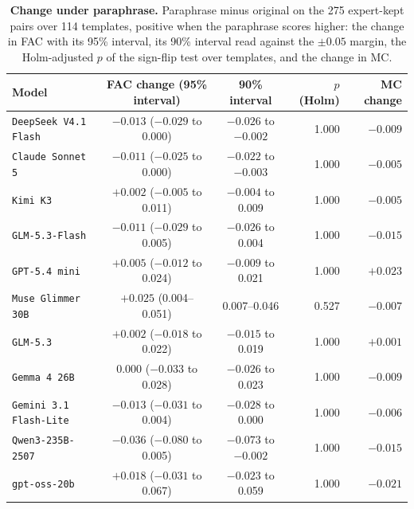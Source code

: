 \begin{table}[t]
\centering
\footnotesize
\renewcommand{\arraystretch}{1.1}
\begin{tabular}{l c c r r}
\toprule
\rowcolor{gray!10}
\textbf{Model} & \textbf{FAC change (95\% interval)} & \textbf{90\% interval} & \textbf{$p$ (Holm)} & \textbf{MC change} \\
\midrule
\texttt{DeepSeek V4.1 Flash} & $-0.013$ ($-0.029$ to 0.000) & $-0.026$ to $-0.002$ & 1.000 & $-0.009$ \\
\texttt{Claude Sonnet 5} & $-0.011$ ($-0.025$ to 0.000) & $-0.022$ to $-0.003$ & 1.000 & $-0.005$ \\
\texttt{Kimi K3} & $+0.002$ ($-0.005$ to 0.011) & $-0.004$ to 0.009 & 1.000 & $-0.005$ \\
\texttt{GLM-5.3-Flash} & $-0.011$ ($-0.029$ to 0.005) & $-0.026$ to 0.004 & 1.000 & $-0.015$ \\
\texttt{GPT-5.4 mini} & $+0.005$ ($-0.012$ to 0.024) & $-0.009$ to 0.021 & 1.000 & $+0.023$ \\
\texttt{Muse Glimmer 30B} & $+0.025$ (0.004--0.051) & 0.007--0.046 & 0.527 & $-0.007$ \\
\texttt{GLM-5.3} & $+0.002$ ($-0.018$ to 0.022) & $-0.015$ to 0.019 & 1.000 & $+0.001$ \\
\texttt{Gemma 4 26B} & $0.000$ ($-0.033$ to 0.028) & $-0.026$ to 0.023 & 1.000 & $-0.009$ \\
\texttt{Gemini 3.1 Flash-Lite} & $-0.013$ ($-0.031$ to 0.004) & $-0.028$ to 0.000 & 1.000 & $-0.006$ \\
\texttt{Qwen3-235B-2507} & $-0.036$ ($-0.080$ to 0.005) & $-0.073$ to $-0.002$ & 1.000 & $-0.015$ \\
\texttt{gpt-oss-20b} & $+0.018$ ($-0.031$ to 0.067) & $-0.023$ to 0.059 & 1.000 & $-0.021$ \\
\bottomrule
\end{tabular}
\caption{\textbf{Change under paraphrase.} Paraphrase minus original on the 275 expert-kept pairs
over 114 templates, positive when the paraphrase scores higher: the change in FAC with its 95\%
interval, its 90\% interval read against the $\pm 0.05$ margin, the Holm-adjusted $p$ of the
sign-flip test over templates, and the change in MC.}
\label{tab:paraphrase}
\end{table}
